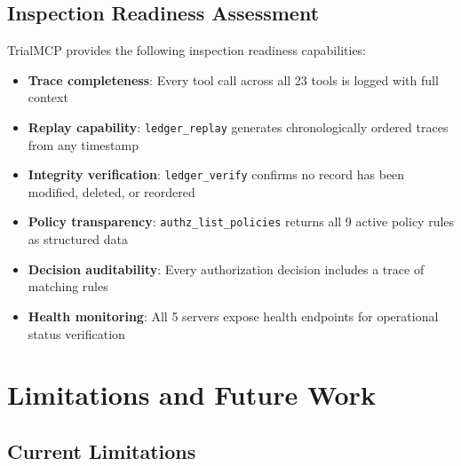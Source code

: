 \documentclass[10pt,letterpaper]{article}
\begin{document}
\subsection{Inspection Readiness Assessment}

TrialMCP provides the following inspection readiness capabilities:

\begin{itemize}[leftmargin=2em]
    \item \textbf{Trace completeness}: Every tool call across all 23 tools is logged with full context
    \item \textbf{Replay capability}: \texttt{ledger\_replay} generates chronologically ordered traces from any timestamp
    \item \textbf{Integrity verification}: \texttt{ledger\_verify} confirms no record has been modified, deleted, or reordered
    \item \textbf{Policy transparency}: \texttt{authz\_list\_policies} returns all 9 active policy rules as structured data
    \item \textbf{Decision auditability}: Every authorization decision includes a trace of matching rules
    \item \textbf{Health monitoring}: All 5 servers expose health endpoints for operational status verification
\end{itemize}

\section{Limitations and Future Work}

\subsection{Current Limitations}
\end{document}
